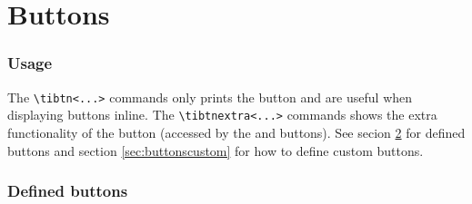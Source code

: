 \documentclass[a4paper,12pt]{article}
\begin{document}
\clearpage\part{Buttons}

\section{Usage}

The \verb|\tibtn<...>| commands only prints the button and are useful when
displaying buttons inline. The \verb|\tibtnextra<...>| commands shows the extra
functionality of the button (accessed by the \tibtnsecond{} and \tibtnalpha{}
buttons). See secion \ref{sec:button} for defined buttons and section
\ref{sec:buttonscustom} for how to define custom buttons.

\section{Defined buttons} \label{sec:button}
\end{document}

